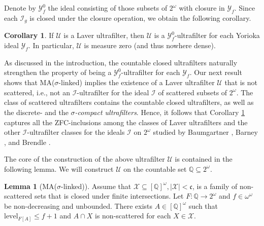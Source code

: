\documentclass[12pt]{article}
\theoremstyle{definition}
\newtheorem{lem}[nummer]{\sc Lemma}
\newtheorem{cor}[nummer]{\sc Corollary}
\newcommand\level{\text{level}}
\begin{document}
Denote by $\mathcal{Y}_f^0$ the ideal consisting of those subsets of $2^\omega$ with closure in $\mathcal{Y}_f$. Since each $\mathcal{I}_g$ is closed under the closure operation, we obtain the following corollary.

\begin{cor}\label{cor:yorioka}
If $\mathcal{U}$ is a Laver ultrafilter, then $\mathcal{U}$ is a $\mathcal{Y}_f^0$-ultrafilter for each Yorioka ideal $\mathcal{Y}_f$. In particular, $\mathcal{U}$ is measure zero (and thus nowhere dense).
\end{cor}

As discussed in the introduction, the countable closed ultrafilters naturally strengthen the property of being a $\mathcal{Y}_f^0$-ultrafilter for each $\mathcal{Y}_f$. Our next result shows that \textsf{MA}($\sigma$-linked) implies the existence of a Laver ultrafilter $\mathcal{U}$ that is not scattered, i.e., not an $\mathcal{I}$-ultrafilter for the ideal $\mathcal{I}$ of scattered subsets of $2^\omega$. The class of scattered ultrafilters contains the countable closed ultrafilters, as well as the discrete- and the \emph{$\sigma$-compact ultrafilters}. Hence, it follows that Corollary \ref{cor:yorioka} captures all the \textsf{ZFC}-inclusions among the classes of Laver ultrafilters and the other $\mathcal{I}$-ultrafilter classes for the ideals $\mathcal{I}$ on $2^\omega$ studied by Baumgartner \cite{baumgartner-uf}, Barney \cite{barney-uf}, and Brendle \cite{brendle-between}.

The core of the construction of the above ultrafilter $\mathcal{U}$ is contained in the following lemma. We will construct $\mathcal{U}$ on the countable set $\mathbb{Q}\subseteq 2^\omega$.

\begin{lem}[\textsf{MA}($\sigma$-linked)]\label{lem:starnonscattered}
	Assume that $\mathcal{X}\subseteq [\mathbb{Q}]^{\omega}, |\mathcal{X}|<\mathfrak{c}$, is a family of non-scattered sets that is closed under finite intersections. Let $F: \mathbb{Q}\to 2^\omega$ and $f \in \omega^{\omega}$ be non-decreasing and unbounded. There exists $A \in [\mathbb{Q}]^\omega$ such that $\level_{F[A]}\leq f+1$ and $A \cap X$
 is non-scattered for each $X \in \mathcal{X}$.
 \end{lem}
 
\end{document}
